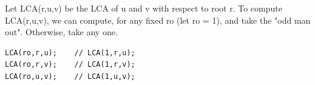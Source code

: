 Let LCA(r,u,v) be the LCA of u and v with respect to root r. To compute LCA(r,u,v), we can compute, for any fixed ro (let ro = 1), and take the "odd man out". Otherwise, take any one.
\begin{verbatim}
LCA(ro,r,u);    // LCA(1,r,u);
LCA(ro,r,v);    // LCA(1,r,v);
LCA(ro,u,v);    // LCA(1,u,v);
\end{verbatim}
